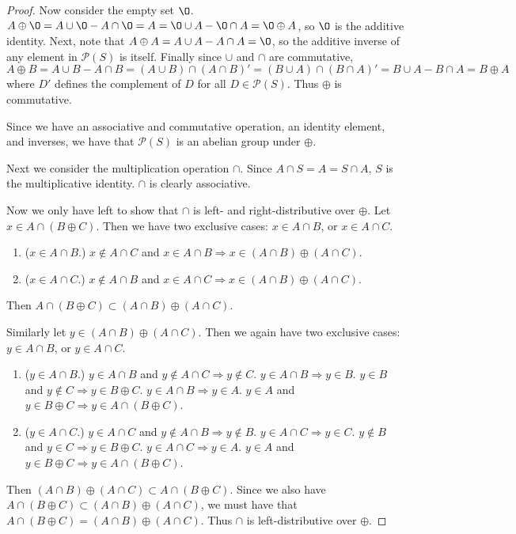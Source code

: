 \documentclass{abrice}
\renewcommand{\P}{\mathscr{P}}
\begin{document}
\begin{proof}
  Now consider the empty set $\O$. $A \oplus \O = A \cup \O - A \cap \O = A = \O
  \cup A - \O \cap A = \O \oplus A$, so $\O$ is the additive identity. Next,
  note that $A \oplus A = A \cup A - A \cap A = \O$, so the additive inverse of
  any element in $\P(S)$ is itself. Finally since $\cup$ and $\cap$ are
  commutative, $A \oplus B = A \cup B - A \cap B = (A \cup B) \cap (A \cap B)' =
  (B \cup A) \cap (B \cap A)' = B \cup A - B \cap A = B \oplus A$ where $D'$
  defines the complement of $D$ for all $D \in \P(S)$. Thus $\oplus$
  is commutative.

  Since we have an associative and commutative operation, an identity element,
  and inverses, we have that $\P(S)$ is an abelian group under $\oplus$.

  Next we consider the multiplication operation $\cap$. Since $A \cap S = A = S
  \cap A$, $S$ is the multiplicative identity. $\cap$ is clearly associative.

  Now we only have left to show that $\cap$ is left- and right-distributive over
  $\oplus$. Let $x \in A \cap (B \oplus C)$. Then we have two exclusive cases:
  $x \in A \cap B$, or $x \in A \cap C$.
  \begin{enumerate}[label=\emph{\roman*})]
  \item ($x \in A \cap B$.) $x \notin A \cap C$ and $x \in A \cap B \Rightarrow
    x \in (A \cap B) \oplus (A \cap C)$.
  \item ($x \in A \cap C$.) $x \notin A \cap B$ and $x \in A \cap C \Rightarrow
    x \in (A \cap B) \oplus (A \cap C)$.
  \end{enumerate}
  Then $A \cap (B \oplus C) \subset (A \cap B) \oplus (A \cap C)$.

  Similarly let $y \in (A \cap B) \oplus (A \cap C)$. Then we again have two
  exclusive cases: $y \in A \cap B$, or $y \in A \cap C$.
  \begin{enumerate}[label=\emph{\roman*})]
  \item ($y \in A \cap B$.) $y \in A \cap B$ and $y \notin A \cap C \Rightarrow
    y \notin C$. $y \in A \cap B \Rightarrow y \in B$. $y \in B$ and $y \notin C
    \Rightarrow y \in B \oplus C$. $y \in A \cap B \Rightarrow y \in A$. $y \in
    A$ and $y \in B \oplus C \Rightarrow y \in A \cap (B \oplus C)$.
  \item ($y \in A \cap C$.) $y \in A \cap C$ and $y \notin A \cap B \Rightarrow
    y \notin B$. $y \in A \cap C \Rightarrow y \in C$. $y \notin B$ and $y \in C
    \Rightarrow y \in B \oplus C$. $y \in A \cap C \Rightarrow y \in A$. $y \in
    A$ and $y \in B \oplus C \Rightarrow y \in A \cap (B \oplus C)$.
  \end{enumerate}
  Then $(A \cap B) \oplus (A \cap C) \subset A \cap (B \oplus C)$. Since we also
  have $A \cap (B \oplus C) \subset (A \cap B) \oplus (A \cap C)$, we must have
  that $A \cap (B \oplus C) = (A \cap B) \oplus (A \cap C)$. Thus $\cap$ is
  left-distributive over $\oplus$.


\end{proof}
\end{document}
